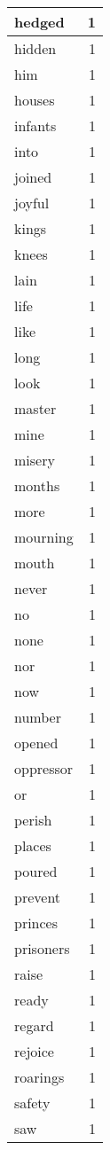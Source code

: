 \begin{center}
\begin{longtable}{l|r}
hedged & 1 \\ \hline
hidden & 1 \\ \hline
him & 1 \\ \hline
houses & 1 \\ \hline
infants & 1 \\ \hline
into & 1 \\ \hline
joined & 1 \\ \hline
joyful & 1 \\ \hline
kings & 1 \\ \hline
knees & 1 \\ \hline
lain & 1 \\ \hline
life & 1 \\ \hline
like & 1 \\ \hline
long & 1 \\ \hline
look & 1 \\ \hline
master & 1 \\ \hline
mine & 1 \\ \hline
misery & 1 \\ \hline
months & 1 \\ \hline
more & 1 \\ \hline
mourning & 1 \\ \hline
mouth & 1 \\ \hline
never & 1 \\ \hline
no & 1 \\ \hline
none & 1 \\ \hline
nor & 1 \\ \hline
now & 1 \\ \hline
number & 1 \\ \hline
opened & 1 \\ \hline
oppressor & 1 \\ \hline
or & 1 \\ \hline
perish & 1 \\ \hline
places & 1 \\ \hline
poured & 1 \\ \hline
prevent & 1 \\ \hline
princes & 1 \\ \hline
prisoners & 1 \\ \hline
raise & 1 \\ \hline
ready & 1 \\ \hline
regard & 1 \\ \hline
rejoice & 1 \\ \hline
roarings & 1 \\ \hline
safety & 1 \\ \hline
saw & 1 \\ \hline

\end{longtable}
\end{center}
